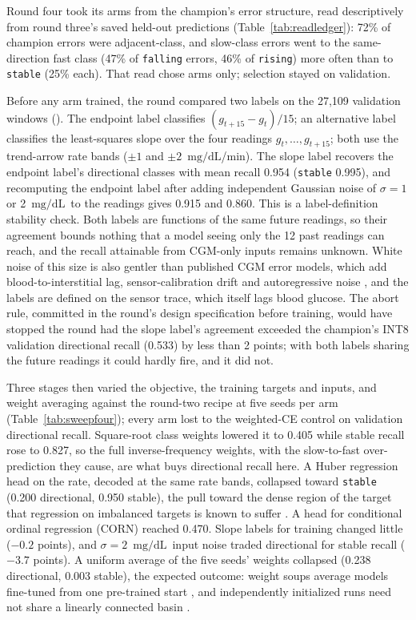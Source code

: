 \documentclass[10pt,twocolumn]{article}
\newcommand{\mgdl}{\ensuremath{\mathrm{mg/dL}}}
\begin{document}
Round four took its arms from the champion's error structure, read
descriptively from round three's saved held-out predictions
(Table~\ref{tab:readledger}): 72\% of champion errors were adjacent-class,
and slow-class errors went to the same-direction fast class (47\% of
\texttt{falling} errors, 46\% of \texttt{rising}) more often than to
\texttt{stable} (25\% each). That read chose arms only; selection stayed
on validation.

Before any arm trained, the round compared two labels on the 27,109
validation windows (). The endpoint label
classifies $(g_{t+15}-g_t)/15$; an alternative label classifies the
least-squares slope over the four readings $g_t,\ldots,g_{t+15}$; both
use the trend-arrow rate bands ($\pm1$ and $\pm2$~\mgdl/min). The slope
label recovers the endpoint label's directional classes with mean recall
0.954 (\texttt{stable} 0.995), and recomputing the endpoint label after
adding independent Gaussian noise of $\sigma=1$ or 2~\mgdl\ to the
readings gives 0.915 and 0.860. This is a label-definition stability
check. Both labels are functions of the same future readings, so their
agreement bounds nothing that a model seeing only the 12 past readings
can reach, and the recall attainable from CGM-only inputs remains
unknown. White noise of this size is also gentler than published CGM
error models, which add blood-to-interstitial lag, sensor-calibration
drift and autoregressive noise \cite{facchinetti2014sensor}, and the
labels are defined on the sensor trace, which itself lags blood glucose.
The abort rule, committed in the round's design specification before
training, would have stopped the round had the slope label's agreement
exceeded the champion's INT8 validation directional recall (0.533) by
less than 2 points; with both labels sharing the future readings it could
hardly fire, and it did not.

Three stages then varied the objective, the training targets and inputs,
and weight averaging against the round-two recipe at five seeds per arm
(Table~\ref{tab:sweepfour}); every arm lost to the weighted-CE control on
validation directional recall. Square-root class weights lowered it to
0.405 while stable recall rose to 0.827, so the full inverse-frequency
weights, with the slow-to-fast over-prediction they cause, are what buys
directional recall here. A Huber regression head on the rate, decoded at
the same rate bands, collapsed toward \texttt{stable} (0.200 directional,
0.950 stable), the pull toward the dense region of the target that
regression on imbalanced targets is known to suffer
\cite{yang2021imbalanced}. A head for conditional ordinal regression
(CORN) \cite{shi2023corn} reached 0.470. Slope labels for training
changed little ($-0.2$ points), and $\sigma=2$~\mgdl\ input noise traded
directional for stable recall ($-3.7$ points). A uniform average of the
five seeds' weights collapsed (0.238 directional, 0.003 stable), the
expected outcome: weight soups average models fine-tuned from one
pre-trained start \cite{wortsman2022soups}, and independently initialized
runs need not share a linearly connected basin \cite{frankle2020linear}.
\end{document}
